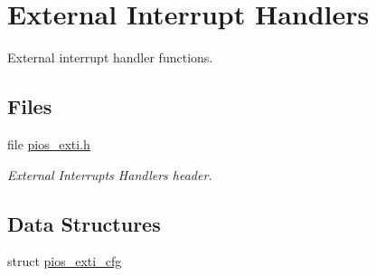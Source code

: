 \hypertarget{group___p_i_o_s___e_x_t_i}{\section{External Interrupt Handlers}
\label{group___p_i_o_s___e_x_t_i}
}


External interrupt handler functions.  


\subsection*{Files}
\begin{DoxyCompactItemize}
\item 
file \hyperlink{pios__exti_8h}{pios\-\_\-exti.\-h}
\begin{DoxyCompactList}\small\item\em External Interrupts Handlers header. \end{DoxyCompactList}\end{DoxyCompactItemize}
\subsection*{Data Structures}
\begin{DoxyCompactItemize}
\item 
struct \hyperlink{structpios__exti__cfg}{pios\-\_\-exti\-\_\-cfg}
\end{DoxyCompactItemize}
